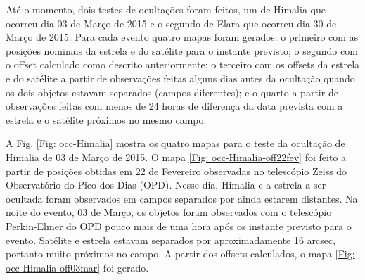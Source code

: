 \documentclass[12pt,a4paper]{monografia}
\begin{document}
Até o momento, dois testes de ocultações foram feitos, um de Himalia que ocorreu dia 03 de Março de 2015 e o segundo de Elara que ocorreu dia 30 de Março de 2015. Para cada evento quatro mapas foram gerados: o primeiro com as posições nominais da estrela e do satélite para o instante previsto; o segundo com o offset calculado como descrito anteriormente; o terceiro com os offsets da estrela e do satélite a partir de observações feitas alguns dias antes da ocultação quando os dois objetos estavam separados (campos diferentes); e o quarto a partir de observações feitas com menos de 24 horas de diferença da data prevista com a estrela e o satélite próximos no mesmo campo.

A Fig. \ref{Fig: occ-Himalia} mostra os quatro mapas para o teste da ocultação de Himalia de 03 de Março de 2015. O mapa \ref{Fig: occ-Himalia-off22fev} foi feito a partir de posições obtidas em 22 de Fevereiro observadas no telescópio Zeiss do Observatório do Pico dos Dias (OPD). Nesse dia, Himalia e a estrela a ser ocultada foram observados em campos separados por ainda estarem distantes. Na noite do evento, 03 de Março, os objetos foram observados com o telescópio Perkin-Elmer do OPD pouco mais de uma hora após os instante previsto para o evento. Satélite e estrela estavam separados por aproximadamente 16 arcsec, portanto muito próximos no campo. A partir dos offsets calculados, o mapa \ref{Fig: occ-Himalia-off03mar} foi gerado.
\end{document}

